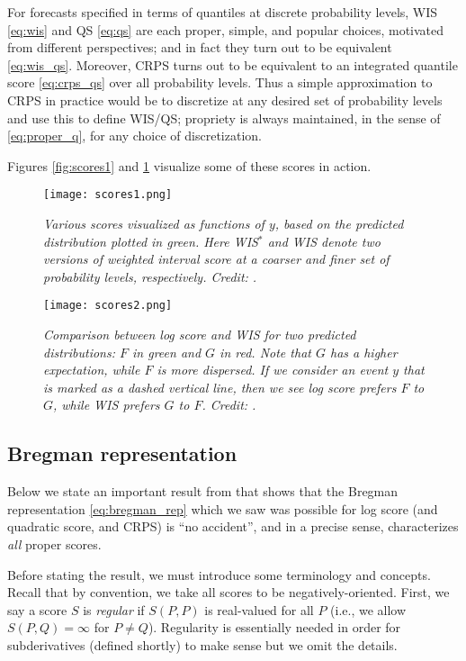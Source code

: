 \documentclass{article}
\begin{document}
For forecasts specified in terms of quantiles at discrete probability levels,
WIS \eqref{eq:wis} and QS \eqref{eq:qs} are each proper, simple, and popular
choices, motivated from different perspectives; and in fact they turn out to be 
equivalent \eqref{eq:wis_qs}. Moreover, CRPS turns out to be equivalent
to an integrated quantile score \eqref{eq:crps_qs} over all probability
levels. Thus a simple approximation to CRPS in practice would be to discretize
at any desired set of probability levels and use this to define WIS/QS;
propriety is always maintained, in the sense of \eqref{eq:proper_q}, for any
choice of discretization.     

Figures \ref{fig:scores1} and \ref{fig:scores2} visualize some of these scores
in action. 

\begin{figure}[p]
\centering
\texttt{[image: scores1.png]}
\caption{\it Various scores visualized as functions of $y$, based on the
  predicted distribution plotted in green. Here WIS$^*$ and WIS denote two
  versions of weighted interval score at a coarser and finer set of probability
  levels, respectively. Credit: \citet{bracher2021evaluating}.}       
\label{fig:scores1}   

\bigskip\medskip

\texttt{[image: scores2.png]}
\caption{\it Comparison between log score and WIS for two predicted
  distributions: $F$ in green and $G$ in red. Note that $G$ has a higher
  expectation, while $F$ is more dispersed. If we consider an event $y$ that is
  marked as a dashed vertical line, then we see log score prefers $F$ to $G$,
  while WIS prefers $G$ to $F$. Credit: \citet{bracher2021evaluating}.}           
\label{fig:scores2}
\end{figure}

\subsection{Bregman representation}
\label{sec:bregman_rep}

Below we state an important result from \citet{gneiting2007strictly} that shows
that the Bregman representation \eqref{eq:bregman_rep} which we saw was possible 
for log score (and quadratic score, and CRPS) is ``no accident'', and in a
precise sense, characterizes \emph{all} proper scores.    

Before stating the result, we must introduce some terminology and
concepts. Recall that by convention, we take all scores to be
negatively-oriented. First, we say a score $S$ is \emph{regular} if $S(P,P)$ is 
real-valued for all $P$ (i.e., we allow $S(P, Q) = \infty$ for $P \not=
Q$). Regularity is essentially needed in order for subderivatives (defined 
shortly) to make sense but we omit the details. 
\end{document}
